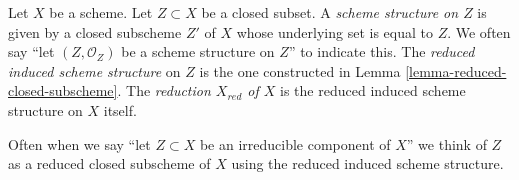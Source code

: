 \begin{definition}
\label{definition-reduced-induced-scheme}
Let $X$ be a scheme. Let $Z \subset X$ be a closed subset.
A {\it scheme structure on $Z$} is given by a closed subscheme $Z'$ of
$X$ whose underlying set is equal to $Z$. We often say
``let $(Z, \mathcal{O}_Z)$ be a scheme structure on $Z$'' to
indicate this. The {\it reduced induced scheme structure}
on $Z$ is the one constructed in Lemma \ref{lemma-reduced-closed-subscheme}.
The {\it reduction $X_{red}$ of $X$} is the reduced induced scheme
structure on $X$ itself.
\end{definition}

\noindent
Often when we say ``let $Z \subset X$ be an irreducible component of $X$''
we think of $Z$ as a reduced closed subscheme of $X$ using the reduced induced
scheme structure.

